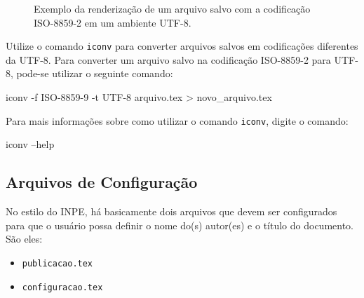 \begin{figure}[H]
\caption{Exemplo da renderização de um arquivo salvo com a codificação ISO-8859-2 em um ambiente UTF-8.}
\label{fig:leiame}
\end{figure}

%

\begin{marker}
Utilize o comando {\tt iconv} para converter arquivos salvos em codificações diferentes da UTF-8. Para converter um arquivo salvo na codificação ISO-8859-2 para UTF-8, pode-se utilizar o seguinte comando:
\medskip
\begin{commandshell}
iconv -f ISO-8859-9 -t UTF-8 arquivo.tex > novo_arquivo.tex
\end{commandshell}
\medskip
Para mais informações sobre como utilizar o comando {\tt iconv}, digite o comando:
\smallskip
\begin{commandshell}
iconv --help
\end{commandshell}
\end{marker}

\subsection{Arquivos de Configuração}
\label{sec:configura}

No estilo do INPE, há basicamente dois arquivos que devem ser configurados para que o usuário possa definir o nome do(s) autor(es) e o título do documento. São eles:

\begin{itemize}
    \item {\tt publicacao.tex}
    \item {\tt configuracao.tex}
\end{itemize}

